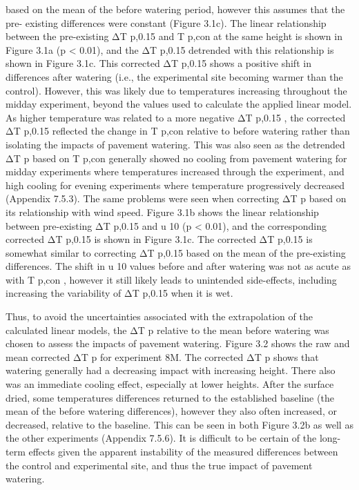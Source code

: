 \documentclass[final,3p,times,authoryear]{elsarticle}
\begin{document}
based on the mean of the before watering period, however this assumes that the pre-
existing differences were constant (Figure 3.1c).
The linear relationship between the pre-existing ΔT p,0.15 and T p,con at the same height is
shown in Figure 3.1a (p < 0.01), and the ΔT p,0.15 detrended with this relationship is
shown in Figure 3.1c. This corrected ΔT p,0.15 shows a positive shift in differences after watering (i.e., the experimental site becoming warmer than the control). However, this
was likely due to temperatures increasing throughout the midday experiment, beyond
the values used to calculate the applied linear model. As higher temperature was related
to a more negative ΔT p,0.15 , the corrected ΔT p,0.15 reflected the change in T p,con relative to
before watering rather than isolating the impacts of pavement watering. This was also
seen as the detrended ΔT p based on T p,con generally showed no cooling from pavement
watering for midday experiments where temperatures increased through the experiment,
and high cooling for evening experiments where temperature progressively decreased
(Appendix 7.5.3).
The same problems were seen when correcting ΔT p based on its relationship with wind
speed. Figure 3.1b shows the linear relationship between pre-existing ΔT p,0.15 and u 10 (p
< 0.01), and the corresponding corrected ΔT p,0.15 is shown in Figure 3.1c. The corrected
ΔT p,0.15 is somewhat similar to correcting ΔT p,0.15 based on the mean of the pre-existing
differences. The shift in u 10 values before and after watering was not as acute as with
T p,con , however it still likely leads to unintended side-effects, including increasing the
variability of ΔT p,0.15 when it is wet.

Thus, to avoid the uncertainties associated with the extrapolation of the calculated linear
models, the ΔT p relative to the mean before watering was chosen to assess the impacts
of pavement watering. Figure 3.2 shows the raw and mean corrected ΔT p for experiment
8M. The corrected ΔT p shows that watering generally had a decreasing impact with
increasing height. There also was an immediate cooling effect, especially at lower
heights. After the surface dried, some temperatures differences returned to the
established baseline (the mean of the before watering differences), however they also
often increased, or decreased, relative to the baseline. This can be seen in both Figure
3.2b as well as the other experiments (Appendix 7.5.6). It is difficult to be certain of the
long-term effects given the apparent instability of the measured differences between the
control and experimental site, and thus the true impact of pavement watering.
\end{document}
